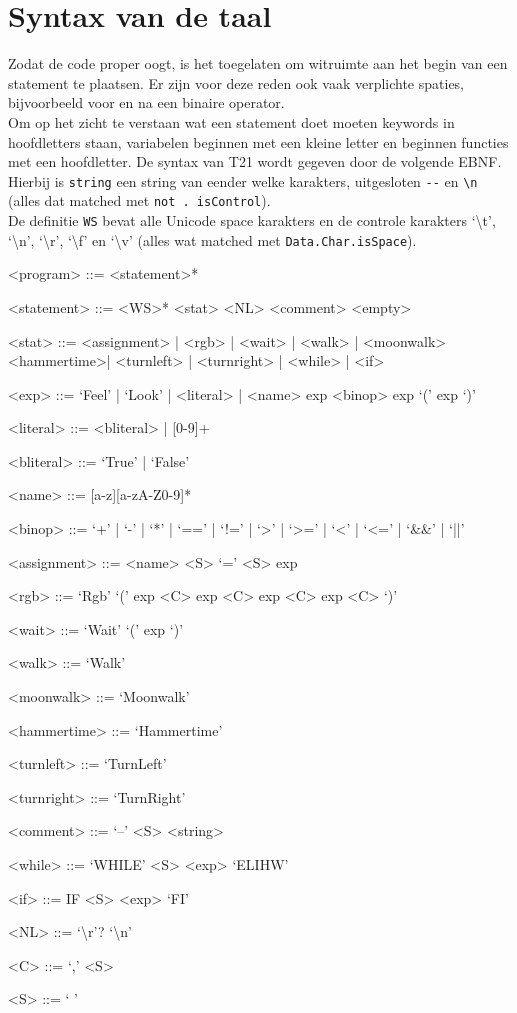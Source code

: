 \documentclass[a4paper]{article}
\begin{document}
\section{Syntax van de taal}
Zodat de code proper oogt, is het toegelaten om witruimte aan het begin van een statement te plaatsen.
Er zijn voor deze reden ook vaak verplichte spaties, bijvoorbeeld voor en na een binaire operator.\\
Om op het zicht te verstaan wat een statement doet moeten keywords in hoofdletters staan, variabelen beginnen met een kleine letter en beginnen functies met een hoofdletter.
De syntax van T21 wordt gegeven door de volgende EBNF.\\
Hierbij is \verb|string| een string van eender welke karakters, uitgesloten \verb|--| en \verb|\n| (alles dat matched met \verb|not . isControl|).\\
De definitie \verb|WS| bevat alle Unicode space karakters en de controle karakters `\textbackslash t', `\textbackslash n', `\textbackslash r', `\textbackslash f' en `\textbackslash v' (alles wat matched met \verb|Data.Char.isSpace|).
\setlength{\grammarindent}{12em}
\begin{grammar}

<program> ::= <statement>*

<statement> ::= <WS>* <stat> <NL>
\alt <comment>
\alt <empty>

<stat> ::= <assignment> | <rgb> | <wait> | <walk> | <moonwalk>
\alt <hammertime>| <turnleft> | <turnright> | <while> | <if>

<exp> ::= `Feel' | `Look' | <literal> | <name>
\alt exp <binop> exp 
\alt `(' exp `)'

<literal> ::= <bliteral> | [0-9]+

<bliteral> ::= `True' | `False'

<name> ::= [a-z][a-zA-Z0-9]*

<binop> ::= `+' | `-' | `*' | `==' | `!=' | `>' | `>=' | `<' | `<=' | `&&' | `||'

<assignment> ::= <name> <S> `=' <S> exp

<rgb> ::= `Rgb' `(' exp <C> exp <C> exp <C> exp <C> `)'

<wait> ::= `Wait' `(' exp `)'

<walk> ::= `Walk'

<moonwalk> ::= `Moonwalk'

<hammertime> ::= `Hammertime'

<turnleft> ::= `TurnLeft'

<turnright> ::= `TurnRight'

<comment> ::= `--' <S> <string>

<while> ::= `WHILE' <S> <exp> `ELIHW'

<if> ::= IF <S> <exp> `FI'

<NL> ::= `\textbackslash r'? `\textbackslash n'

<C> ::= `,' <S>

<S> ::= ` '
\end{grammar}
\end{document}
